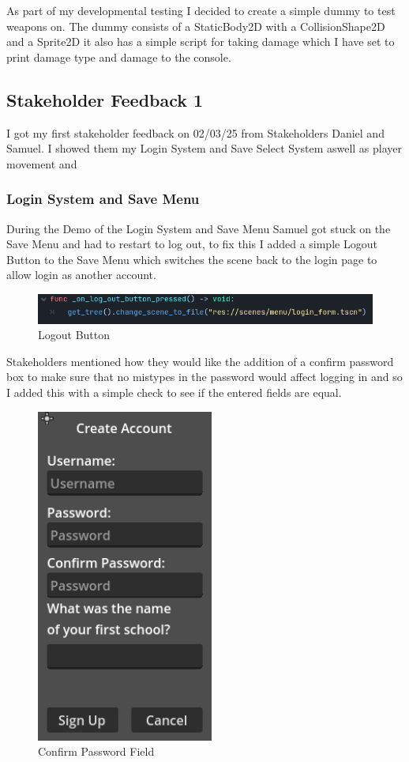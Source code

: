\documentclass{article}
\begin{document}
        As part of my developmental testing I decided to create a simple dummy to test weapons on. The dummy consists of a StaticBody2D with a CollisionShape2D and a Sprite2D it also has a simple script for taking damage which I have set to print damage type and damage to the console.\\
        \subsection{Stakeholder Feedback 1}
        I got my first stakeholder feedback on 02/03/25 from Stakeholders Daniel and Samuel. I showed them my Login System and Save Select System aswell as player movement and 
        \subsubsection{Login System and Save Menu}
        During the Demo of the Login System and Save Menu Samuel got stuck on the Save Menu and had to restart to log out, to fix this I added a simple Logout Button to the Save Menu which switches the scene back to the login page to allow login as another account.\\
        \begin{figure}[H]
                \centering
                \includegraphics[width = 0.9\columnwidth]{images/development/SaveMenu_logout.PNG}
                \caption{Logout Button}
        \end{figure}
        Stakeholders mentioned how they would like the addition of a confirm password box to make sure that no mistypes in the password would affect logging in and so I added this with a simple check to see if the entered fields are equal.\\
        \begin{figure}[H]
                \centering
                \includegraphics[width = 0.3\columnwidth]{images/development/CreateAccountForm_layout2.PNG}
                \caption{Confirm Password Field}
        \end{figure}
\end{document}
